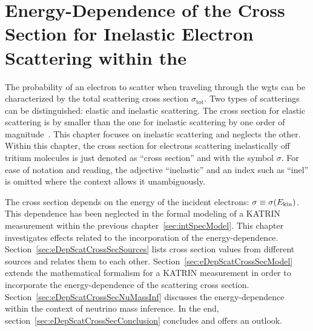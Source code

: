 \def\currentRootFolder{chapter/energyDependentCrossSec}
\def\currentFigureFolder{\currentRootFolder/fig}


\chapter{Energy-Dependence of the Cross Section for Inelastic Electron Scattering within the }
\label{sec:eDepScatCrossSec}
The probability of an electron to scatter when traveling through the \gls{wgts} can be characterized by the total scattering cross section $\sigma_\mathrm{tot}$. Two types of scatterings can be distinguished: elastic and inelastic scattering. The cross section for elastic scattering is by smaller than the one for inelastic scattering by one order of magnitude~\cite{Kleesiek2019}. This chapter focuses on inelastic scattering and neglects the other. Within this chapter, the cross section for electrons scattering inelastically off tritium molecules is just denoted as ``cross section'' and with the symbol $\sigma$. For ease of notation and reading, the adjective ``inelastic'' and an index such as ``inel'' is omitted where the context allows it unambiguously.

The cross section depends on the energy of the incident electrons: $\sigma \equiv \sigma(E_\mathrm{kin})$. This dependence has been neglected in the formal modeling of a KATRIN measurement within the previous chapter~\ref{sec:intSpecModel}. This chapter investigates effects related to the incorporation of the energy-dependence. Section~\ref{sec:eDepScatCrossSecSources} lists cross section values from different sources and relates them to each other. Section~\ref{sec:eDepScatCrossSecModel} extends the mathematical formalism for a KATRIN measurement in order to incorporate the energy-dependence of the scattering cross section. Section~\ref{sec:eDepScatCrossSecNuMassInf} discusses the energy-dependence within the context of neutrino mass inference. In the end, section~\ref{sec:eDepScatCrossSecConclusion} concludes and offers an outlook.



